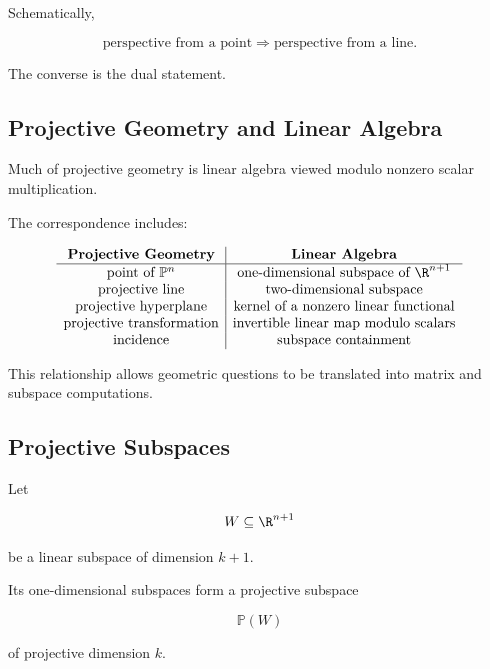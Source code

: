 Schematically,

\[
\boxed{
\text{perspective from a point}
\Longrightarrow
\text{perspective from a line}.
}
\]

The converse is the dual statement.

\subsection{Projective Geometry and Linear Algebra}
\label{subsec:projective-linear-algebra}

Much of projective geometry is linear algebra viewed modulo nonzero scalar
multiplication.

The correspondence includes:

\[
\begin{array}{c|c}
\textbf{Projective Geometry} & \textbf{Linear Algebra}\\
\hline
\text{point of }\mathbb{P}^{n} &
\text{one-dimensional subspace of }\R^{n+1}\\
\text{projective line} &
\text{two-dimensional subspace}\\
\text{projective hyperplane} &
\text{kernel of a nonzero linear functional}\\
\text{projective transformation} &
\text{invertible linear map modulo scalars}\\
\text{incidence} &
\text{subspace containment}
\end{array}
\]

This relationship allows geometric questions to be translated into matrix
and subspace computations.

\subsection{Projective Subspaces}
\label{subsec:projective-subspaces}

Let

\[
W\subseteq\R^{n+1}
\]

be a linear subspace of dimension \(k+1\).

Its one-dimensional subspaces form a projective subspace

\[
\mathbb{P}(W)
\]

of projective dimension \(k\).

